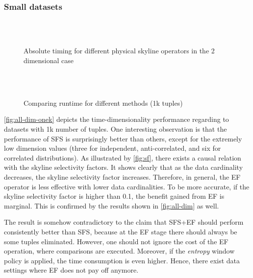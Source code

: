 \subsubsection{Small datasets}
\label{sec:small-datasets}

\begin{figure}[htbp]
\centering%
\begin{minipage}{\onecolumnwidth}%
\\
\\
%
\caption{Absolute timing for different physical skyline operators 
in the 2 dimensional case}%
\end{minipage}%
\hspace{\columnsep}%
\begin{minipage}{\onecolumnwidth}%
\\
\\
%
\caption{Comparing runtime for different methods (1k tuples)}
\label{fig:all-dim-onek}
\end{minipage}%
\end{figure}

\autoref{fig:all-dim-onek} depicts the time-dimensionality
performance regarding to datasets with 1k number of tuples.  One
interesting observation is that the performance of SFS is surprisingly
better than others, except for the extremely low dimension values
(three for independent, anti-correlated, and six for correlated
distributions).  As illustrated by \autoref{fig:sf}, there exists a
causal relation with the skyline selectivity factors.  It shows
clearly that as the data cardinality decreases, the skyline
selectivity factor increases. Therefore, in general, the EF operator
is less effective with lower data cardinalities. To be more accurate,
if the skyline selectivity factor is higher than 0.1, the benefit
gained from EF is marginal.  This is confirmed by the results shown in
\autoref{fig:all-dim} as well.

The result is somehow contradictory to the claim that SFS+EF should
perform consistently better than SFS, because at the EF stage there
should always be some tuples eliminated. However, one should not
ignore the cost of the EF operation, where comparisons are
executed. Moreover, if the \emph{entropy} window policy is applied,
the time consumption is even higher. Hence, there exist data settings
where EF does not pay off anymore.

